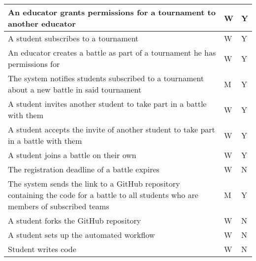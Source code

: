 \begin{center}
\begin{longtable}{|p{8.7cm}|p{3cm}|p{3cm}|}
        An educator grants permissions for a tournament to another educator                                                                   & W                      & Y               \\ \hline
        A student subscribes to a tournament                                                                                                  & W                      & Y               \\ \hline
        An educator creates a battle as part of a tournament he has permissions for                                                           & W                      & Y               \\ \hline
        The system notifies students subscribed to a tournament about a new battle in said tournament                                         & M                      & Y               \\ \hline
        A student invites another student to take part in a battle with them                                                                  & W                      & Y               \\ \hline
        A student accepts the invite of another student to take part in a battle with them                                                    & W                      & Y               \\ \hline
        A student joins a battle on their own                                                                                                 & W                      & Y               \\ \hline
        The registration deadline of a battle expires                                                                                         & W                      & N               \\ \hline
        The system sends the link to a GitHub repository containing the code for a battle to all students who are members of subscribed teams & M                      & Y               \\ \hline
        A student forks the GitHub repository                                                                                                 & W                      & N               \\ \hline
        A student sets up the automated workflow                                                                                              & W                      & N               \\ \hline
        Student writes code                                                                                                                   & W                      & N               \\ \hline

\end{longtable}
\end{center}
